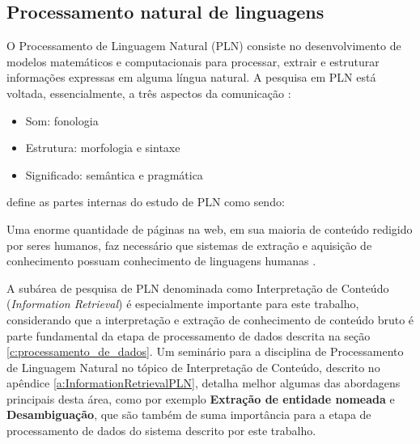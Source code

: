 \subsection{Processamento natural de linguagens} \label{ss:processamento_natural_de_linguagens}

O Processamento de Linguagem Natural (PLN) consiste no desenvolvimento de modelos matemáticos e computacionais para processar, extrair e estruturar informações expressas em alguma língua natural. A pesquisa em PLN está voltada, essencialmente, a três aspectos da comunicação \cite{doprocessamento}:
\begin{itemize}
\item  Som: fonologia
\item  Estrutura: morfologia e sintaxe
\item  Significado: semântica e pragmática
\end{itemize}

 define as partes internas do estudo de PLN como sendo:

\begin{quote}
\end{quote}

Uma enorme quantidade de páginas na web, em sua maioria de conteúdo redigido por seres humanos, faz necessário que sistemas de extração e aquisição de conhecimento possuam conhecimento de linguagens humanas \cite{inteligencia-artificial}.

A subárea de pesquisa de PLN denominada como Interpretação de Conteúdo (\textit{Information Retrieval}) é especialmente importante para este trabalho, considerando que a interpretação e extração de conhecimento de conteúdo bruto é parte fundamental da etapa de processamento de dados descrita na seção \ref{c:processamento_de_dados}. Um seminário para a disciplina de Processamento de Linguagem Natural no tópico de Interpretação de Conteúdo, descrito no apêndice \ref{a:InformationRetrievalPLN}, detalha melhor algumas das abordagens principais desta área, como por exemplo \textbf{Extração de entidade nomeada} e \textbf{Desambiguação}, que são também de suma importância para a etapa de processamento de dados do sistema descrito por este trabalho.

